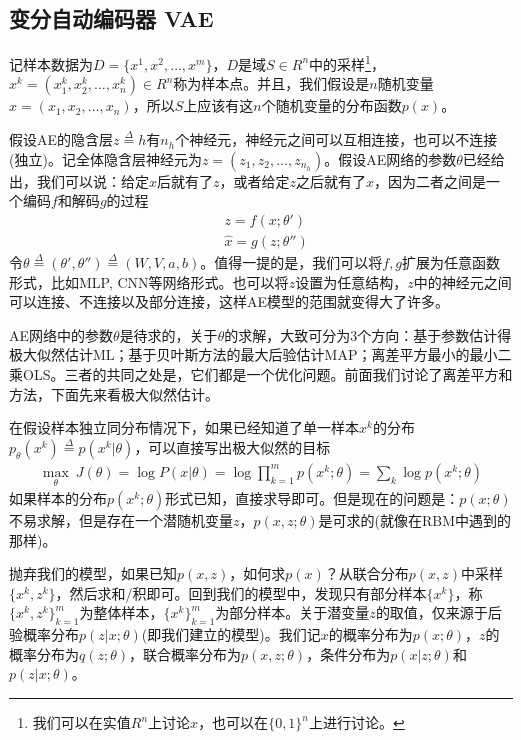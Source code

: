     \subsection{变分自动编码器 VAE}
        \par
        记样本数据为$D=\{x^1,x^2,\dots,x^m\}$，$D$是域$S\in R^n$中的采样\footnote{我们可以在实值$R^n$上讨论$x$，也可以在$\{0,1\}^n$上进行讨论。}，$x^k = (x_1^k,x_2^k,\dots,x_n^k)\in R^n$称为样本点。并且，我们假设是$n$随机变量$x = (x_1,x_2,\dots,x_n)$，所以$S$上应该有这$n$个随机变量的分布函数$p(x)$。
        \par
        假设AE的隐含层$z\overset{\Delta}{=}h$有$n_h$个神经元，神经元之间可以互相连接，也可以不连接(独立)。记全体隐含层神经元为$z = (z_1,z_2,\dots,z_{n_h})$。假设AE网络的参数$\theta$已经给出，我们可以说：给定$x$后就有了$z$，或者给定$z$之后就有了$x$，因为二者之间是一个编码$f$和解码$g$的过程
        \begin{align*}
        & z = f(x;\theta')\\
        & \hat{x} = g(z;\theta'')
        \end{align*}
        令$\theta \overset{\Delta}{=}(\theta',\theta'')\overset{\Delta}{=}(W,V,a,b)$。值得一提的是，我们可以将$f,g$扩展为任意函数形式，比如MLP, CNN等网络形式。也可以将$z$设置为任意结构，$z$中的神经元之间可以连接、不连接以及部分连接，这样AE模型的范围就变得大了许多。
        \par
        AE网络中的参数$\theta$是待求的，关于$\theta$的求解，大致可分为3个方向：基于参数估计得极大似然估计ML；基于贝叶斯方法的最大后验估计MAP；离差平方最小的最小二乘OLS。三者的共同之处是，它们都是一个优化问题。前面我们讨论了离差平方和方法，下面先来看极大似然估计。
        \par
        在假设样本独立同分布情况下，如果已经知道了单一样本$x^k$的分布 $p_\theta(x^k)\overset{\Delta}{=}p(x^k|\theta) $，可以直接写出极大似然的目标
        \begin{align*}
        \max_\theta\ J(\theta) = \log P(x|\theta) = \log \prod_{k=1}^mp(x^k;\theta) = \sum_{k} \log p(x^k;\theta)
        \end{align*}
        如果样本的分布$p(x^k;\theta)$形式已知，直接求导即可。但是现在的问题是：$p(x;\theta)$不易求解，但是存在一个潜随机变量$z$，$p(x,z;\theta)$是可求的(就像在RBM中遇到的那样)。
        \par
        抛弃我们的模型，如果已知$p(x,z)$，如何求$p(x)$？从联合分布$p(x,z)$中采样$\{x^k,z^k\}$，然后求和/积即可。回到我们的模型中，发现只有部分样本$\{x^k\}$，称$\{x^k,z^k\}_{k=1}^m$为整体样本，$\{x^k\}_{k=1}^m$为部分样本。关于潜变量$z$的取值，仅来源于后验概率分布$p(z|x;\theta)$(即我们建立的模型)。我们记$x$的概率分布为$p(x;\theta)$，$z$的概率分布为$q(z;\theta)$，联合概率分布为$p(x,z;\theta)$，条件分布为$p(x|z;\theta)$和$p(z|x;\theta)$。
